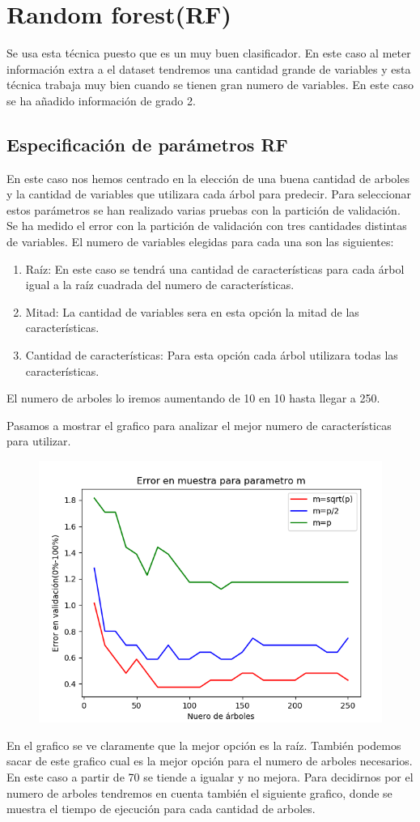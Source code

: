 \documentclass[titlepage]{article}
\begin{document}
	

	\section{Random forest(RF)}	
	Se usa esta técnica puesto que es un muy buen clasificador. En este caso al meter información extra a el dataset tendremos una cantidad grande de variables y esta técnica trabaja muy bien cuando se tienen gran numero de variables. En este caso se ha añadido información de grado 2.
	\subsection{Especificación de parámetros RF} 
	En este caso nos hemos centrado en la elección de una buena cantidad de arboles y la cantidad de variables que utilizara cada árbol para predecir. Para seleccionar estos parámetros se han realizado varias pruebas con la partición de validación. Se ha medido el error con la partición de validación con tres cantidades distintas de variables. El numero de variables elegidas para cada una son las siguientes:
	\begin{enumerate}
		\item Raíz: En este caso se tendrá una cantidad de características para cada árbol igual a la raíz cuadrada del numero de características. 
		\item Mitad: La cantidad de variables sera en esta opción la mitad de las características.
		\item Cantidad de características: Para esta opción cada árbol utilizara todas las características.
	\end{enumerate}

	El numero de arboles lo iremos aumentando de 10 en 10 hasta llegar a 250. 
	
	Pasamos a mostrar el grafico para analizar el mejor numero de características para utilizar.
	\begin{figure}[H]
		\centering
		\includegraphics[width=0.7\linewidth]{../imagenesRF/errorvalidacion}
		\caption{}
		\label{fig:Cantidad de variables RF}
	\end{figure}
	En el grafico se ve claramente que la mejor opción es la raíz. También podemos sacar de este grafico cual es la mejor opción para el numero de arboles necesarios. En este caso a partir de 70 se tiende a igualar y no mejora. Para decidirnos por el numero de arboles tendremos en cuenta también el siguiente grafico, donde se muestra el tiempo de ejecución para cada cantidad de arboles.
	
\end{document}
